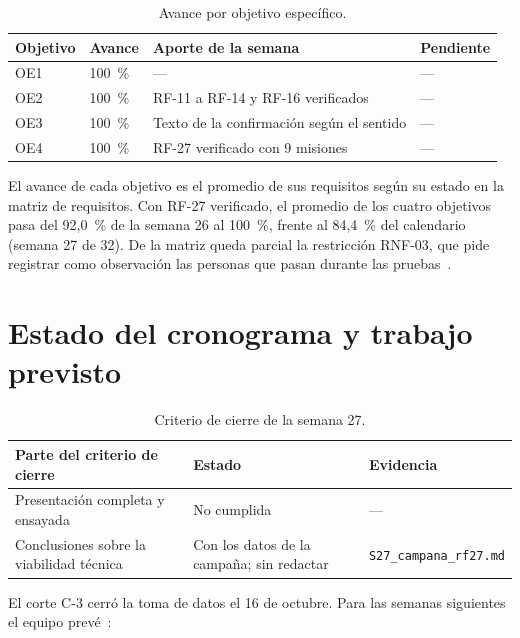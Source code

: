 \documentclass[12pt,letterpaper]{article}
\begin{document}
\begin{table}[H]
    \centering
    \small
    \caption{Avance por objetivo específico.}
    \label{tab:avance}
    \begin{tabular}{@{}p{2.0cm}p{2.0cm}p{5.2cm}p{4.8cm}@{}}
        \toprule
        \textbf{Objetivo} & \textbf{Avance} & \textbf{Aporte de la semana} & \textbf{Pendiente} \\ \midrule
        OE1 & 100~\% & --- & --- \\ \addlinespace
        OE2 & 100~\% & RF-11 a RF-14 y RF-16 verificados & --- \\ \addlinespace
        OE3 & 100~\% & Texto de la confirmación según el sentido & --- \\ \addlinespace
        OE4 & 100~\% & RF-27 verificado con 9 misiones & --- \\ \bottomrule
    \end{tabular}
\end{table}

El avance de cada objetivo es el promedio de sus requisitos según su estado en la matriz de requisitos. Con RF-27 verificado, el promedio de los cuatro objetivos pasa del 92,0~\% de la semana 26 al 100~\%, frente al 84,4~\% del calendario (semana 27 de 32). De la matriz queda parcial la restricción RNF-03, que pide registrar como observación las personas que pasan durante las pruebas~\cite{requisitos}.

\section{Estado del cronograma y trabajo previsto}

\begin{table}[H]
    \centering
    \small
    \caption{Criterio de cierre de la semana 27.}
    \label{tab:criterio}
    \begin{tabular}{@{}p{4.2cm}p{3.6cm}p{6.2cm}@{}}
        \toprule
        \textbf{Parte del criterio de cierre} & \textbf{Estado} & \textbf{Evidencia} \\ \midrule
        Presentación completa y ensayada & No cumplida & --- \\ \addlinespace
        Conclusiones sobre la viabilidad técnica & Con los datos de la campaña; sin redactar & \texttt{S27\_campana\_rf27.md} \\ \bottomrule
    \end{tabular}
\end{table}

El corte C-3 cerró la toma de datos el 16 de octubre. Para las semanas siguientes el equipo prevé~\cite{cronograma}:
\end{document}
